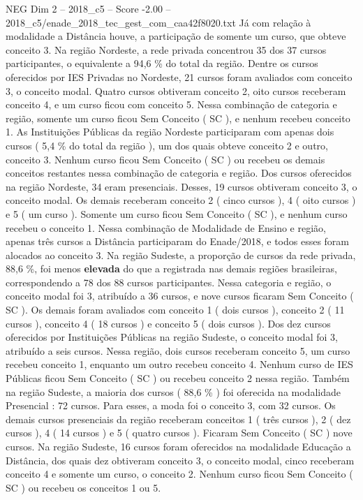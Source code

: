 \begin{textsample}{NEG Dim 2 – 2018\_c5 – Score -2.00 – 2018\_c5/enade\_2018\_tec\_gest\_com\_caa42f8020.txt}
Já com relação à modalidade a Distância houve, a participação de somente um curso, que obteve conceito 3.
Na região Nordeste, a rede privada concentrou 35 dos 37 cursos participantes, o equivalente a 94,6 \% do total da região.
Dentre os cursos oferecidos por IES Privadas no Nordeste, 21 cursos foram avaliados com conceito 3, o conceito modal.
Quatro cursos obtiveram conceito 2, oito cursos receberam conceito 4, e um curso ficou com conceito 5.
Nessa combinação de categoria e região, somente um curso ficou Sem Conceito ( SC ), e nenhum recebeu conceito 1.
As Instituições Públicas da região Nordeste participaram com apenas dois cursos ( 5,4 \% do total da região ), um dos quais obteve conceito 2 e outro, conceito 3.
Nenhum curso ficou Sem Conceito ( SC ) ou recebeu os demais conceitos restantes nessa combinação de categoria e região.
Dos cursos oferecidos na região Nordeste, 34 eram presenciais.
Desses, 19 cursos obtiveram conceito 3, o conceito modal.
Os demais receberam conceito 2 ( cinco cursos ), 4 ( oito cursos ) e 5 ( um curso ).
Somente um curso ficou Sem Conceito ( SC ), e nenhum curso recebeu o conceito 1.
Nessa combinação de Modalidade de Ensino e região, apenas três cursos a Distância participaram do Enade/2018, e todos esses foram alocados ao conceito 3.
Na região Sudeste, a proporção de cursos da rede privada, 88,6 \%, foi menos \textbf{elevada} do que a registrada nas demais regiões brasileiras, correspondendo a 78 dos 88 cursos participantes.
Nessa categoria e região, o conceito modal foi 3, atribuído a 36 cursos, e nove cursos ficaram Sem Conceito ( SC ).
Os demais foram avaliados com conceito 1 ( dois cursos ), conceito 2 ( 11 cursos ), conceito 4 ( 18 cursos ) e conceito 5 ( dois cursos ).
Dos dez cursos oferecidos por Instituições Públicas na região Sudeste, o conceito modal foi 3, atribuído a seis cursos.
Nessa região, dois cursos receberam conceito 5, um curso recebeu conceito 1, enquanto um outro recebeu conceito 4.
Nenhum curso de IES Públicas ficou Sem Conceito ( SC ) ou recebeu conceito 2 nessa região.
Também na região Sudeste, a maioria dos cursos ( 88,6 \% ) foi oferecida na modalidade Presencial : 72 cursos.
Para esses, a moda foi o conceito 3, com 32 cursos.
Os demais cursos presenciais da região receberam conceitos 1 ( três cursos ), 2 ( dez cursos ), 4 ( 14 cursos ) e 5 ( quatro cursos ).
Ficaram Sem Conceito ( SC ) nove cursos.
Na região Sudeste, 16 cursos foram oferecidos na modalidade Educação a Distância, dos quais dez obtiveram conceito 3, o conceito modal, cinco receberam conceito 4 e somente um curso, o conceito 2.
Nenhum curso ficou Sem Conceito ( SC ) ou recebeu os conceitos 1 ou 5.

\end{textsample}
